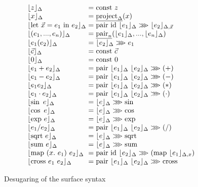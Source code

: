 \documentclass{sigplanconf}
\newcommand{\comp}{\mathrel{>\kern-0.45em>\kern-0.45em>}}
\newcommand{\elab}[1]{\lfloor #1 \rfloor}
\theoremstyle{examplestyle}
\begin{document}
\begin{figure}
  \centering
  \begin{displaymath}
    \begin{array}{l@{\hspace{0.3em}}c@{\hspace{0.3em}}l}
      \elab{z}_\Delta & = & \mathrm{const}~z \\
      \elab{x}_\Delta & = & \underline{\mathrm{project}_\Delta}(x) \\
      \elab{\mathrm{let}~\vec{x} = e_1\textrm{ in }e_2}_\Delta & = & \mathrm{pair}~\mathrm{id}~\elab{e_1}_\Delta \comp \elab{e_2}_{\Delta, \vec{x}} \\
      \elab{(e_1,...,e_n)}_\Delta &=& \underline{\mathrm{pair}_n}(\elab{e_1}_\Delta, ..., \elab{e_n}_\Delta) \\
      \elab{e_1(e_2)}_\Delta &=& \elab{e_2}_\Delta \comp e_1 \\
      \elab{\vec{c}}_\Delta &=& \mathrm{const}~\vec{c} \\
      \elab{0}_\Delta &=& \mathrm{const}~0 \\
      \elab{e_1 + e_2}_\Delta &=& \mathrm{pair}~\elab{e_1}_\Delta~\elab{e_2}_\Delta \comp (+) \\
      \elab{e_1 - e_2}_\Delta &=& \mathrm{pair}~\elab{e_1}_\Delta~\elab{e_2}_\Delta \comp (-) \\
      \elab{e_1 e_2}_\Delta &=& \mathrm{pair}~\elab{e_1}_\Delta~\elab{e_2}_\Delta \comp (*) \\
      \elab{e_1 \cdot e_2}_\Delta &=& \mathrm{pair}~\elab{e_1}_\Delta~\elab{e_2}_\Delta \comp (\cdot) \\
      \elab{\sin~e}_\Delta &=& \elab{e}_\Delta \comp \sin \\
      \elab{\cos~e}_\Delta &=& \elab{e}_\Delta \comp \cos \\
      \elab{\mathrm{exp}~e}_\Delta &=& \elab{e}_\Delta \comp \mathrm{exp} \\
      \elab{e_1 / e_2}_\Delta &=& \mathrm{pair}~\elab{e_1}_\Delta~\elab{e_2}_\Delta \comp (/) \\
      \elab{\mathrm{sqrt}~e}_\Delta &=& \elab{e}_\Delta \comp \mathrm{sqrt} \\
      \elab{\mathrm{sum}~e}_\Delta &=& \elab{e}_\Delta \comp \mathrm{sum} \\
      \elab{\mathrm{map}~(x.~e_1)~e_2}_\Delta &=& \mathrm{pair}~\mathrm{id}~\elab{e_2}_\Delta \comp (\mathrm{map}~\elab{e_1}_{\Delta,x}) \\
      \elab{\mathrm{cross}~e_1~e_2}_\Delta &=& \mathrm{pair}~\elab{e_1}_\Delta~\elab{e_2}_\Delta \comp \mathrm{cross}
    \end{array}
  \end{displaymath}
  \caption{Desugaring of the surface syntax}
  \label{fig:desugar}
\end{figure}
\end{document}
